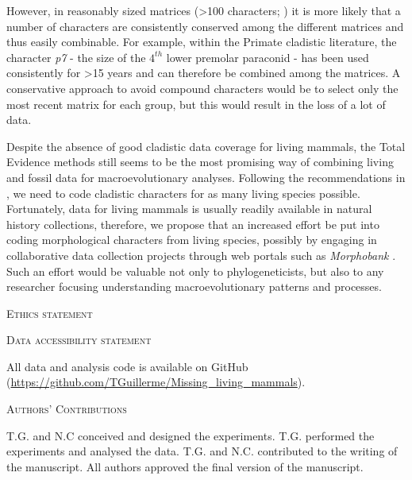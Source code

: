 \documentclass[12pt,letterpaper]{article}
\renewcommand{\section}[1]{%
\bigskip
\begin{center}
\begin{Large}
\normalfont\scshape #1
\medskip
\end{Large}
\end{center}}
\begin{document}
However, in reasonably sized matrices (\textgreater 100 characters; \citealp{GuillermeCooper,harrisonamong-character2014}) it is more likely that a number of characters are consistently conserved among the different matrices and thus easily combinable.
For example, within the Primate cladistic literature, the character \textit{p7} - the size of the $4^{th}$ lower premolar paraconid - has been used consistently for \textgreater 15 years \citep[e.g.][]{ross1998phylogenetic,marivaux2005anthropoid,kay2008anatomy,boyer2010astragalar,ni2013oldest} and can therefore be combined among the matrices.
A conservative approach to avoid compound characters would be to select only the most recent matrix for each group, but this would result in the loss of a lot of data.

Despite the absence of good cladistic data coverage for living mammals, the Total Evidence methods still seems to be the most promising way of combining living and fossil data for macroevolutionary analyses. 
Following the recommendations in \citep{GuillermeCooper}, we need to code cladistic characters for as many living species possible. 
Fortunately, data for living mammals is usually readily available in natural history collections, therefore, we propose that an increased effort be put into coding morphological characters from living species, possibly by engaging in collaborative data collection projects through web portals such as \textit{Morphobank} \citep{morphobank}.
Such an effort would be valuable not only to phylogeneticists, but also to any researcher focusing understanding macroevolutionary patterns and processes.%

\section{Ethics statement}
\section{Data accessibility statement}
All data and analysis code is available on GitHub (\url{https://github.com/TGuillerme/Missing_living_mammals}).
\section{Authors' Contributions}
T.G. and N.C conceived and designed the experiments. T.G. performed the experiments and analysed the data. T.G. and N.C. contributed to the writing of the manuscript. All authors approved the final version of the manuscript.
\end{document}
